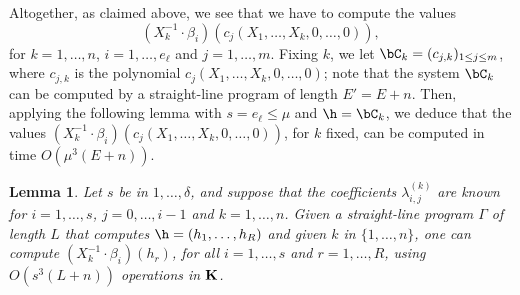 \documentclass[12pt]{article}
\newtheorem{lemma}[definition]{Lemma}
\begin{document}
Altogether, as claimed above, we see that we have to compute the
values
$$(X_k^{-1} \cdot \beta_i)(c_j(X_1,\dots,X_k,0,\dots,0)),$$ for
$k=1,\dots,n$, $i=1,\dots,e_\ell$ and $j=1,\dots,m$.  Fixing $k$, we
let $\bC_k = (c_{j,k})_{1 \le j \le m}$, where $c_{j,k}$ is the
polynomial $c_j(X_1,\dots,X_k,0,\dots,0)$; note that the system $\bC_k$
can be computed by a straight-line program of length $E'=E+n$. Then,
applying the following lemma with $s=e_\ell \le \mu$ and $\h = \bC_k$,
we deduce that the values $(X_k^{-1} \cdot
\beta_i)(c_j(X_1,\dots,X_k,0,\dots,0))$, for $k$ fixed, can be
computed in time $O(\mu^3 (E+n))$.


\begin{lemma}
  Let $s$ be in $1,\dots,\delta$, and suppose that the coefficients
  $\lambda^{(k)}_{i,j}$ are known for $i=1,\dots,s$, $j=0,\dots,i-1$
  and $k=1,\dots,n$. Given a straight-line program $\Gamma$ of length
  $L$ that computes $\h=(h_1,\dots,h_R)$ and given $k$ in
  $\{1,\dots,n\}$, one can compute $(X_k^{-1}\cdot \beta_i)(h_r)$, for
  all $i=1,\dots,s$ and $r=1,\dots,R$, using $O(s^3 (L+n))$
  operations in $\mathbf{K}$.
\end{lemma}
\end{document}
